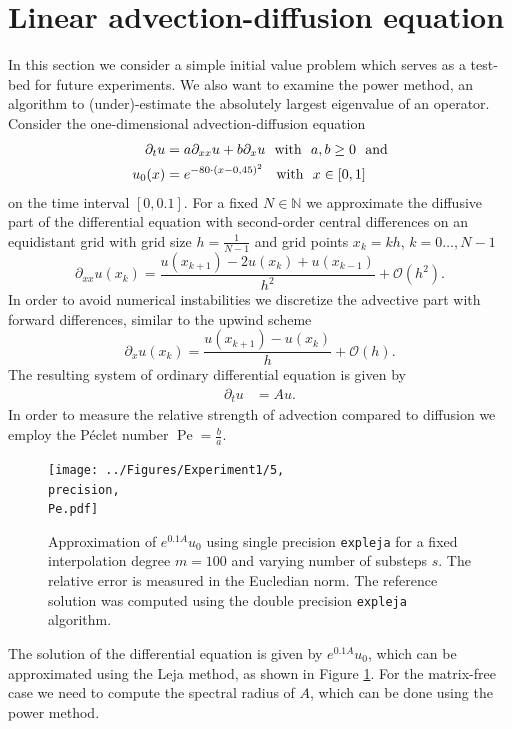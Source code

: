 \documentclass{scrartcl}
\begin{document}
	\section{Linear advection-diffusion equation}\label{sec:LinearADe}
	In this section we consider a simple initial value problem which serves as a test-bed for future experiments. We also want to examine the power method, an algorithm to (under)-estimate the absolutely largest eigenvalue of an operator.\\
	Consider the one-dimensional advection-diffusion equation
	\begin{align}
	\begin{split}
	\partial_tu &= a\partial_{xx}u + b\partial_xu ~~\text{with}~~ a,b\ge 0 ~~\text{and}\\
	u_0(x) &= e^{-80\cdot(x-0,45)^2}\hphantom{,} ~~\text{with}~~ x\in[0,1]
	\end{split}\label{eq:LinearAdvDif}
	\end{align}
	on the time interval $[0,0.1]$. For a fixed $N\in\mathbb N$ we approximate the diffusive part of the differential equation with second-order central differences on an equidistant grid with grid size $h = \frac{1}{N-1}$ and grid points $x_k = kh$, $k=0\dots,N-1$
	\[\partial_{xx}u(x_k) = \frac{u(x_{k+1}) - 2u(x_k) + u(x_{k-1})}{{h}^2} + \mathcal{O}({h}^2).\]
	In order to avoid numerical instabilities we discretize the advective part with forward differences, similar to the upwind scheme
	\[\partial_{x}u(x_k) = \frac{u(x_{k+1}) - u(x_k)}{h} + \mathcal{O}(h).\]
	The resulting system of ordinary differential equation is given by
	\begin{align*}
	\partial_tu &= Au.
	\end{align*}
	In order to measure the relative strength of advection compared to diffusion we employ the P\'eclet number $\operatorname{Pe} = \frac{b}{a}$.
	\begin{figure}[ht]
		\newcommand{\precision}{single}
		\newcommand{\Pe}{Pe=10.0}
		\centering
		\texttt{[image: ../Figures/Experiment1/5, \\precision, \\Pe.pdf]}
		\caption{Approximation of $e^{0.1A}u_0$ using single precision \texttt{expleja} for a fixed interpolation degree $m=100$ and varying number of substeps $s$. The relative error is measured in the Eucledian norm. The reference solution was computed using the double precision \texttt{expleja} algorithm.}
		\label{fig:Experiment1}
	\end{figure} 
	\noindent The solution of the differential equation is given by $e^{0.1A}u_0$, which can be approximated using the Leja method, as shown in Figure \ref{fig:Experiment1}. For the matrix-free case we need to compute the spectral radius of $A$, which can be done using the power method.
	
\end{document}
